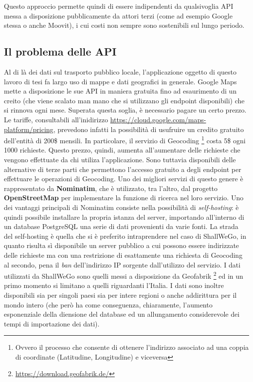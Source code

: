         Questo approccio permette quindi di essere indipendenti da qualsivoglia API messa a disposizione pubblicamente da attori terzi (come ad esempio Google stessa o anche Moovit), i cui costi non sempre sono sostenibili sul lungo periodo.

        \subsection{Il problema delle API}
        Al di là dei dati sul trasporto pubblico locale, l'applicazione oggetto di questo lavoro di tesi fa largo uso di mappe e dati geografici in generale. Google Maps mette a disposizione le sue API in maniera gratuita fino ad esaurimento di un creito (che viene scalato man mano che si utilizzano gli endpoint disponibili) che si rinnova ogni mese. Superata questa soglia, è necessario pagare un certo prezzo.
        Le tariffe, consultabili all'inidirizzo \url{https://cloud.google.com/maps-platform/pricing}, prevedono infatti la possibilità di usufruire un credito gratuito dell'entità di 200\$ mensili. In particolare, il servizio di Geocoding \footnote[1]{Ovvero il processo che consente di ottenere l'indirizzo associato ad una coppia di coordinate (Latitudine, Longitudine) e viceversa} costa 5\$ ogni 1000 richieste. Questo prezzo, quindi, aumenta all'aumentare delle richieste che vengono effettuate da chi utiliza l'applicazione.
        Sono tuttavia disponibili delle alternative di terze parti che permettono l'accesso gratuito a degli endpoint per effettuare le operazioni di Geocoding. Uno dei migliori servizi di questo genere è rappresentato da \textbf{Nominatim}, che è utilizzato, tra l'altro, dal progetto \textbf{OpenStreetMap} per implementare la funzione di ricerca nel loro servizio.
        Uno dei vantaggi principali di Nominatim consiste nella possibilità di \textit{self-hosting}: è quindi possibile installare la propria istanza del server, importando all'interno di un database PostgreSQL una serie di dati provenienti da varie fonti. 
        La strada del self-hosting è quella che si è preferito intraprendere nel caso di ShallWeGo, in quanto risulta sì disponibile un server pubblico a cui possono essere indirizzate delle richieste ma con una restrizione di esattamente una richiesta di Geocoding al secondo, pena il \textit{ban} dell'indirizzo IP sorgente dall'utilizzo del servizio. 
        I dati utilizzati da ShallWeGo sono quelli messi a disposizione da Geofabrik \footnote[2]{\url{https://download.geofabrik.de/}} ed in un primo momento si limitano a quelli riguardanti l'Italia. I dati sono inoltre disponibili sia per singoli paesi sia per intere regioni o anche addirittura per il mondo intero (che però ha come conseguenza, chiaramente, l'aumento esponenziale della diensione del database ed un allungamento considerevole dei tempi di importazione dei dati).
        
